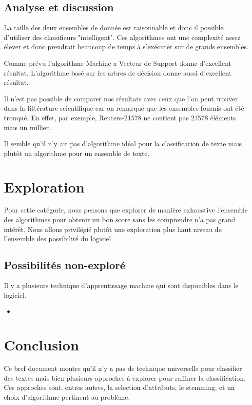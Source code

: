 \documentclass[a4paper,10pt]{article}
\begin{document}
\subsection{Analyse et discussion}

La taille des deux ensembles de donnée est raisonnable et donc il possible d'utiliser des classifieurs "intelligent". Ces algorithmes ont une complexité assez élever et donc prendrait beaucoup de temps à s'exécuter sur de grands ensembles.

Comme prévu l'algorithme Machine a Vecteur de Support donne d'excellent résultat. L'algorithme basé sur les arbres de décision donne aussi d'excellent résultat.

Il n'est pas possible de comparer nos résultats avec ceux que l'on peut trouver dans la littérature scientifique car on remarque que les ensembles fournis ont été tronqué. En effet, par exemple, Reuters-21578 ne contient pas 21578 éléments mais un millier.

Il semble qu'il n'y ait pas d'algorithme idéal pour la classification de texte mais plutôt un algorithme pour un ensemble de texte.

\section{Exploration}

Pour cette catégorie, nous pensons que explorer de manière exhaustive l'ensemble des algorithmes pour obtenir un bon score sans les comprendre n'a pas grand intérêt. Nous allons privilégié plutôt une exploration plus haut niveau de l'ensemble des possibilité du logiciel 
\subsection{Possibilités non-exploré}
Il y a plusieurs technique d'apprentissage machine qui sont disponibles dans le logiciel.
\begin{itemize}
	\item 
\end{itemize}



\section{Conclusion}

Ce bref document montre qu'il n'y a pas de technique universelle pour classifier des textes mais bien plusieurs approches à explorer pour raffiner la classification. Ces approches sont, entres autres, la selection d'attributs, le stemming, et un choix d'algorithme pertinent au problème.
\end{document}
